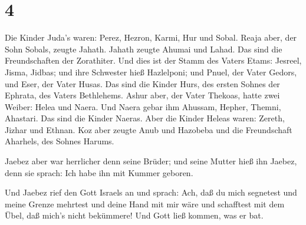 \hypertarget{section-3}{%
\section{4}\label{section-3}}

 Die Kinder Juda's waren: Perez, Hezron, Karmi, Hur und
Sobal.  Reaja aber, der Sohn Sobals, zeugte Jahath. Jahath
zeugte Ahumai und Lahad. Das sind die Freundschaften der Zorathiter.
 Und dies ist der Stamm des Vaters Etams: Jesreel, Jisma,
Jidbas; und ihre Schwester hieß Hazlelponi;  und Pnuel, der
Vater Gedors, und Eser, der Vater Husas. Das sind die Kinder Hurs, des
ersten Sohnes der Ephrata, des Vaters Bethlehems.  Ashur
aber, der Vater Thekoas, hatte zwei Weiber: Helea und Naera.
 Und Naera gebar ihm Ahussam, Hepher, Themni, Ahastari. Das
sind die Kinder Naeras.  Aber die Kinder Heleas waren:
Zereth, Jizhar und Ethnan.  Koz aber zeugte Anub und
Hazobeba und die Freundschaft Aharhels, des Sohnes Harums.

 Jaebez aber war herrlicher denn seine Brüder; und seine
Mutter hieß ihn Jaebez, denn sie sprach: Ich habe ihn mit Kummer
geboren.

 Und Jaebez rief den Gott Israels an und sprach: Ach, daß
du mich segnetest und meine Grenze mehrtest und deine Hand mit mir wäre
und schafftest mit dem Übel, daß mich's nicht bekümmere! Und Gott ließ
kommen, was er bat.

